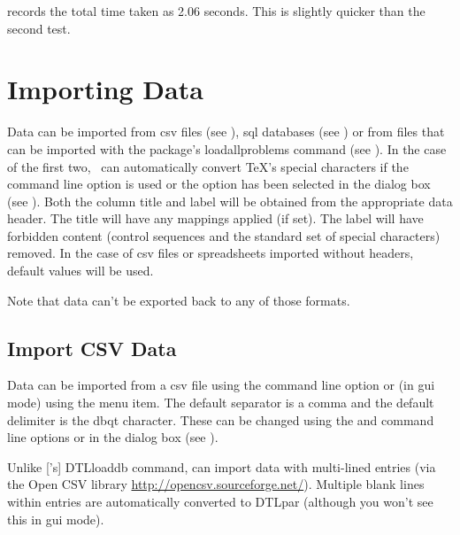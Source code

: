    records the total time taken as 2.06 seconds.
  This is slightly quicker than the second  test.


\chapter{Importing Data}\label{sec:import}

   Data can be imported from \gls{csv} files (see 
   ), \gls{sql} databases (see 
   ) or from files that can be imported with 
   the  package's \gls{loadallproblems} command
   (see ). In the case of the first
   two, \appname\ can automatically convert \TeX's special characters if the
    command line option is used or the
    option has been selected in the 
    dialog box (see ).
   Both the column title and label will be obtained from the appropriate data 
   header.  The title will have any mappings applied (if set). The label will 
   have forbidden content (control sequences and the standard set of special 
   characters) removed. In the case of \gls{csv} files or spreadsheets
   imported without headers, default values will be used.


   Note that data can't be exported back to any of those formats.


\section{Import CSV Data}\label{sec:importcsv}

   Data can be imported from a \gls{csv} file using
   the  command line option or (in \gls{gui} mode)
   using the  menu item. The default
   separator is a \gls{comma} and the default delimiter is the \gls{dbqt}
   character. These can be changed using the  and 
    command line options or in the 
    dialog box (see ).

   Unlike ['s]
   \gls{DTLloaddb} command,  can import data with multi-lined
   entries (via the Open CSV library 
   \url{http://opencsv.sourceforge.net/}).
   Multiple blank lines within entries are automatically converted to
   \gls{DTLpar} (although you won't see this in \gls{gui}
   mode).


